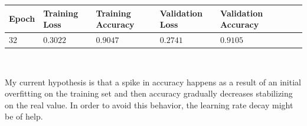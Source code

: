 \documentclass[11pt,a4paper]{article}
\begin{document}
\begin{center}
\begin{tabular}{|p{1.2cm}|p{1.8cm}|p{2cm}|p{2cm}|p{2cm}|p{2cm}|p{2cm}|}
\rowcolor{gray!50}
\hline
\textbf{Epoch} & \textbf{Training Loss} & \textbf{Training Accuracy} & \textbf{Validation Loss} & \textbf{Validation Accuracy}\\
\hline
$32$ & $0.3022$ & $0.9047$ & $0.2741$ & $0.9105$\\
\hline
\end{tabular}\\
\end{center}
My current hypothesis is that a spike in accuracy happens as a result of an initial overfitting on the training set and then accuracy gradually decreases stabilizing on the real value. In order to avoid this behavior, the learning rate decay might be of help.
\end{document}
